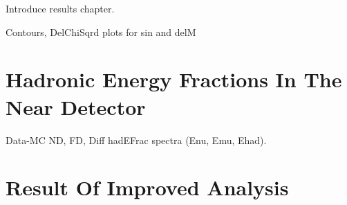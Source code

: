 

Introduce results chapter.

Contours, DelChiSqrd plots for sin and delM


\section{Hadronic Energy Fractions In The Near Detector}

Data-MC ND, FD, Diff hadEFrac spectra (Enu, Emu, Ehad).



\section{Result Of Improved Analysis}

